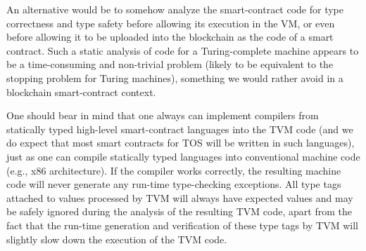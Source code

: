 \documentclass[12pt,oneside]{article}
\begin{document}
An alternative would be to somehow analyze the smart-contract code for type correctness and type safety before allowing its execution in the VM, or even before allowing it to be uploaded into the blockchain as the code of a smart contract. Such a static analysis of code for a Turing-complete machine appears to be a time-consuming and non-trivial problem (likely to be equivalent to the stopping problem for Turing machines), something we would rather avoid in a blockchain smart-contract context.

One should bear in mind that one always can implement compilers from statically typed high-level smart-contract languages into the TVM code (and we do expect that most smart contracts for TOS will be written in such languages), just as one can compile statically typed languages into conventional machine code (e.g., x86 architecture). If the compiler works correctly, the resulting machine code will never generate any run-time type-checking exceptions. All type tags attached to values processed by TVM will always have expected values and may be safely ignored during the analysis of the resulting TVM code, apart from the fact that the run-time generation and verification of these type tags by TVM will slightly slow down the execution of the TVM code.
\end{document}
